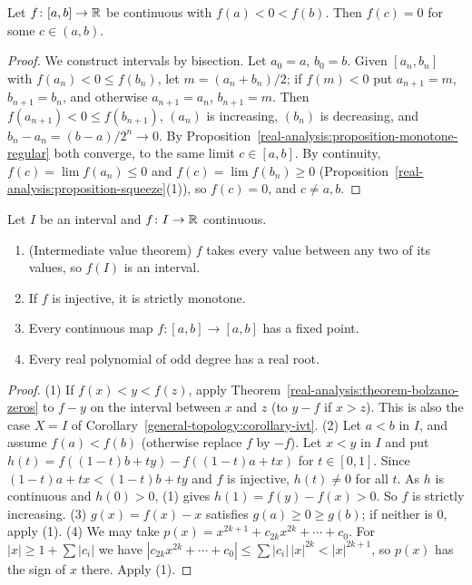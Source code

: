 \begin{theorem}\label{real-analysis:theorem-bolzano-zeros}
Let $f \colon [a, b] \to \mathbb{R}$ be continuous with $f(a) < 0 < f(b)$. Then $f(c) = 0$ for some $c \in (a, b)$.
\end{theorem}

\begin{proof}
We construct intervals by bisection. Let $a_0 = a$, $b_0 = b$. Given $[a_n, b_n]$ with $f(a_n) < 0 \leq f(b_n)$, let $m = (a_n + b_n)/2$; if $f(m) < 0$ put $a_{n+1} = m$, $b_{n+1} = b_n$, and otherwise $a_{n+1} = a_n$,
$b_{n+1} = m$. Then $f(a_{n+1}) < 0 \leq f(b_{n+1})$, $(a_n)$ is increasing, $(b_n)$ is decreasing, and $b_n - a_n = (b - a)/2^n \to 0$. By Proposition~\ref{real-analysis:proposition-monotone-regular} both converge,
to the same limit $c \in [a, b]$. By continuity, $f(c) = \lim f(a_n) \leq 0$ and $f(c) = \lim f(b_n) \geq 0$ (Proposition~\ref{real-analysis:proposition-squeeze}(1)), so $f(c) = 0$, and $c \neq a, b$.
\end{proof}

\begin{corollary}\label{real-analysis:corollary-ivt-real}
Let $I$ be an interval and $f \colon I \to \mathbb{R}$ continuous.
\begin{enumerate}
\item (Intermediate value theorem) $f$ takes every value between any two of its values, so $f(I)$ is an interval.
\item If $f$ is injective, it is strictly monotone.
\item Every continuous map $f \colon [a, b] \to [a, b]$ has a fixed point.
\item Every real polynomial of odd degree has a real root.
\end{enumerate}
\end{corollary}

\begin{proof}
(1) If $f(x) < y < f(z)$, apply Theorem~\ref{real-analysis:theorem-bolzano-zeros} to $f - y$ on the interval between $x$ and $z$ (to $y - f$ if $x > z$). This is also the case $X = I$ of
Corollary~\ref{general-topology:corollary-ivt}.
(2) Let $a < b$ in $I$, and assume $f(a) < f(b)$ (otherwise replace $f$ by $-f$). Let $x < y$ in $I$ and put $h(t) = f((1 - t)b + ty) - f((1 - t)a + tx)$ for $t \in [0, 1]$. Since $(1 - t)a + tx < (1 - t)b + ty$ and $f$ is injective,
$h(t) \neq 0$ for all $t$. As $h$ is continuous and $h(0) > 0$, (1) gives $h(1) = f(y) - f(x) > 0$. So $f$ is strictly increasing.
(3) $g(x) = f(x) - x$ satisfies $g(a) \geq 0 \geq g(b)$; if neither is $0$, apply (1).
(4) We may take $p(x) = x^{2k+1} + c_{2k}x^{2k} + \cdots + c_0$. For $|x| \geq 1 + \sum|c_i|$ we have $|c_{2k}x^{2k} + \cdots + c_0| \leq \sum|c_i|\,|x|^{2k} < |x|^{2k+1}$, so $p(x)$ has the sign of $x$ there. Apply (1).
\end{proof}

